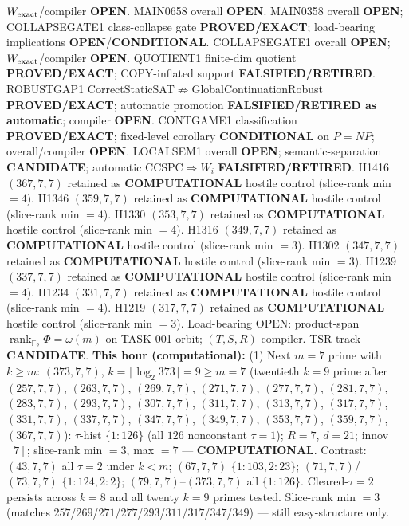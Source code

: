 \documentclass[11pt]{article}
\begin{document}
$W_{\rm exact}$/compiler \textbf{OPEN}.
MAIN0658 overall \textbf{OPEN}.
MAIN0358 overall \textbf{OPEN}; COLLAPSEGATE1 class-collapse gate \textbf{PROVED/EXACT};
load-bearing implications \textbf{OPEN}/\textbf{CONDITIONAL}.
COLLAPSEGATE1 overall \textbf{OPEN}; $W_{\rm exact}$/compiler \textbf{OPEN}.
QUOTIENT1 finite-dim quotient \textbf{PROVED/EXACT}; COPY-inflated support \textbf{FALSIFIED/RETIRED}.
ROBUSTGAP1 CorrectStaticSAT$\not\Rightarrow$GlobalContinuationRobust \textbf{PROVED/EXACT};
automatic promotion \textbf{FALSIFIED/RETIRED as automatic}; compiler \textbf{OPEN}.
CONTGAME1 classification \textbf{PROVED/EXACT}; fixed-level corollary \textbf{CONDITIONAL} on $P=NP$;
overall/compiler \textbf{OPEN}.
LOCALSEM1 overall \textbf{OPEN}; semantic-separation \textbf{CANDIDATE}; automatic CCSPC$\Rightarrow W_i$
\textbf{FALSIFIED/RETIRED}.
H1416 $(367,7,7)$ retained as \textbf{COMPUTATIONAL} hostile control (slice-rank min $=4$).
H1346 $(359,7,7)$ retained as \textbf{COMPUTATIONAL} hostile control (slice-rank min $=4$).
H1330 $(353,7,7)$ retained as \textbf{COMPUTATIONAL} hostile control (slice-rank min $=4$).
H1316 $(349,7,7)$ retained as \textbf{COMPUTATIONAL} hostile control (slice-rank min $=3$).
H1302 $(347,7,7)$ retained as \textbf{COMPUTATIONAL} hostile control (slice-rank min $=3$).
H1239 $(337,7,7)$ retained as \textbf{COMPUTATIONAL} hostile control (slice-rank min $=4$).
H1234 $(331,7,7)$ retained as \textbf{COMPUTATIONAL} hostile control (slice-rank min $=4$).
H1219 $(317,7,7)$ retained as \textbf{COMPUTATIONAL} hostile control (slice-rank min $=3$).
Load-bearing OPEN: product-span $\operatorname{rank}_{\mathbb F_2}\Phi=\omega(m)$ on TASK-001 orbit;
$(T,S,R)$ compiler. TSR track \textbf{CANDIDATE}.
\textbf{This hour (computational):}
(1) Next $m{=}7$ prime with $k{\ge}m$: $(373,7,7)$, $k{=}\lceil\log_2 373\rceil=9{\ge}m{=}7$
(twentieth $k{=}9$ prime after $(257,7,7)$, $(263,7,7)$, $(269,7,7)$, $(271,7,7)$, $(277,7,7)$, $(281,7,7)$, $(283,7,7)$, $(293,7,7)$, $(307,7,7)$, $(311,7,7)$, $(313,7,7)$, $(317,7,7)$, $(331,7,7)$, $(337,7,7)$, $(347,7,7)$, $(349,7,7)$, $(353,7,7)$, $(359,7,7)$, $(367,7,7)$):
$\tau$-hist $\{1{:}126\}$ (all $126$ nonconstant $\tau{=}1$); $R{=}7$, $d{=}21$; innov $[7]$;
slice-rank min $=3$, max $=7$ --- \textbf{COMPUTATIONAL}.
Contrast: $(43,7,7)$ all $\tau{=}2$ under $k{<}m$; $(67,7,7)$ $\{1{:}103,2{:}23\}$;
$(71,7,7)$/$(73,7,7)$ $\{1{:}124,2{:}2\}$; $(79,7,7)$--$(373,7,7)$ all $\{1{:}126\}$.
Cleared-$\tau{=}2$ persists across $k{=}8$ and all twenty $k{=}9$ primes tested.
Slice-rank min $=3$ (matches $257$/$269$/$271$/$277$/$293$/$311$/$317$/$347$/$349$) --- still easy-structure only.
\end{document}
